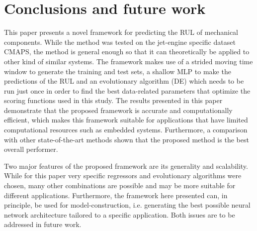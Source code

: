 \documentclass[12pt]{IEEEtran}%
\begin{document}
\section{Conclusions and future work}
\label{sec:conclusions}

This paper presents a novel framework for predicting the RUL of mechanical
components. While the method was tested on the jet-engine specific dataset
CMAPS, the method is general enough so that it can theoretically be applied to
other kind of similar systems. The framework makes use of a strided moving
time window to generate the training and test sets, a shallow MLP to make the
predictions of the RUL and an evolutionary algorithm (DE) which needs to be
run just once in order to find the best data-related parameters that optimize
the scoring functions used in this study. The results presented in this paper
demonstrate that the proposed framework is accurate and computationally
efficient, which makes this framework suitable for applications that have
limited computational resources such as embedded systems. Furthermore, a
comparison with other state-of-the-art methods shown that the proposed method
is the best overall performer.

Two major features of the proposed framework are its generality and
scalability. While for this paper very specific regressors and evolutionary
algorithms were chosen, many other combinations are possible and may be more
suitable for different applications. Furthermore, the framework here presented
can, in principle, be used for model-construction, i.e. generating the best
possible neural network architecture tailored to a specific application. Both
issues are to be addressed in future work.



%



\clearpage
\onecolumn
\end{document}
